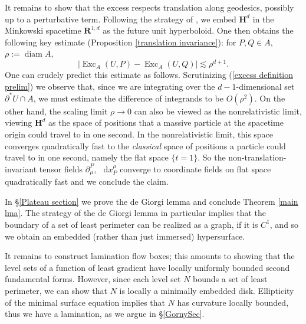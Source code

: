 \documentclass[reqno,10pt]{amsart}
\newcommand{\RR}{\mathbf{R}}
\newcommand{\Hyp}{\mathbf H}
\newcommand{\Sph}{\mathbf S}
\DeclareMathOperator{\diam}{diam}
\DeclareMathOperator{\Exc}{Exc}
\newcommand*\dif{\mathop{}\!\mathrm{d}}
\theoremstyle{definition}
\numberwithin{equation}{section}
\begin{document}
It remains to show that the excess respects translation along geodesics, possibly up to a perturbative term.
Following the strategy of \cite{daskalopoulosPrep1}, we embed $\Hyp^d$ in the Minkowski spacetime $\RR^{1, d}$ as the future unit hyperboloid.
One then obtains the following key estimate (Proposition \ref{translation invariance}): for $P, Q \in A$, $\rho := \diam A$,
$$|\Exc_A(U, P) - \Exc_A(U, Q)| \lesssim \rho^{d + 1}.$$
One can crudely predict this estimate as follows.
Scrutinizing (\ref{excess definition prelim}) we observe that, since we are integrating over the $d-1$-dimensional set $\partial^* U \cap A$, we must estimate the difference of integrands to be $O(\rho^2)$.
On the other hand, the scaling limit $\rho \to 0$ can also be viewed as the nonrelativistic limit, viewing $\Hyp^d$ as the space of positions that a massive particle at the spacetime origin could travel to in one second.
In the nonrelativistic limit, this space converges quadratically fast to the \emph{classical} space of positions a particle could travel to in one second, namely the flat space $\{t = 1\}$.
So the non-translation-invariant tensor fields $\partial_\mu^P$, $\dif x^\mu_P$ converge to coordinate fields on flat space quadratically fast and we conclude the claim.

In \S\ref{Plateau section} we prove the de Giorgi lemma and conclude Theorem \ref{main lma}.
The strategy of the de Giorgi lemma in particular implies that the boundary of a set of least perimeter can be realized as a graph, if it is $C^1$, and so we obtain an embedded (rather than just immersed) hypersurface.

It remains to construct lamination flow boxes; this amounts to showing that the level sets of a function of least gradient have locally uniformly bounded second fundamental forms.
However, since each level set $N$ bounds a set of least perimeter, we can show that $N$ is locally a minimally embedded disk.
Ellipticity of the minimal surface equation implies that $N$ has curvature locally bounded, thus we have a lamination, as we argue in \S\ref{GornySec}.




\end{document}
